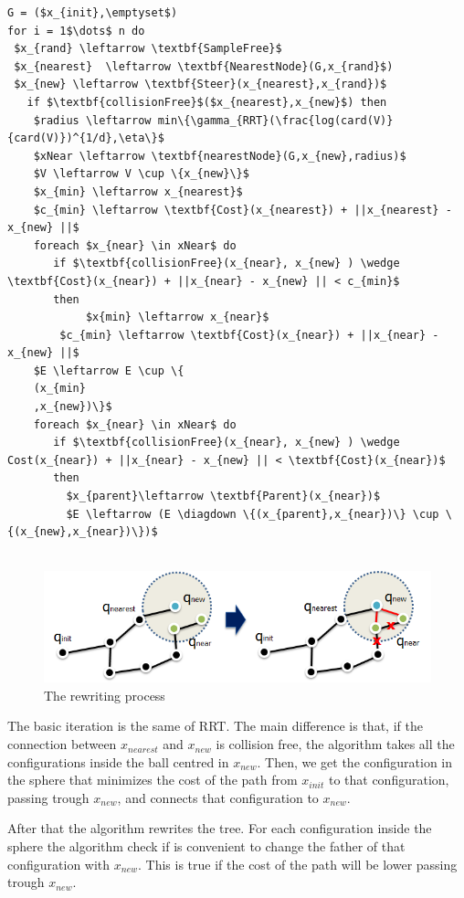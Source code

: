 \documentclass[10pt]{article}
\begin{document}
		\begin{lstlisting}[frame=single, mathescape=true,caption={RRT*}]
G = ($x_{init},\emptyset$)
for i = 1$\dots$ n do
 $x_{rand} \leftarrow \textbf{SampleFree}$
 $x_{nearest}  \leftarrow \textbf{NearestNode}(G,x_{rand}$)
 $x_{new} \leftarrow \textbf{Steer}(x_{nearest},x_{rand})$	
   if $\textbf{collisionFree}$($x_{nearest},x_{new}$) then
	$radius \leftarrow min\{\gamma_{RRT}(\frac{log(card(V)}{card(V)})^{1/d},\eta\}$
	$xNear \leftarrow \textbf{nearestNode}(G,x_{new},radius)$
	$V \leftarrow V \cup \{x_{new}\}$
	$x_{min} \leftarrow x_{nearest}$
	$c_{min} \leftarrow \textbf{Cost}(x_{nearest}) + ||x_{nearest} - x_{new} ||$
	foreach $x_{near} \in xNear$ do
	   if $\textbf{collisionFree}(x_{near}, x_{new} ) \wedge \textbf{Cost}(x_{near}) + ||x_{near} - x_{new} || < c_{min}$
	   then
	        $x{min} \leftarrow x_{near}$
		$c_{min} \leftarrow \textbf{Cost}(x_{near}) + ||x_{near} - x_{new} ||$
	$E \leftarrow E \cup \{
	(x_{min}
	,x_{new})\}$
	foreach $x_{near} \in xNear$ do
	   if $\textbf{collisionFree}(x_{near}, x_{new} ) \wedge Cost(x_{near}) + ||x_{near} - x_{new} || < \textbf{Cost}(x_{near})$
	   then
	     $x_{parent}\leftarrow \textbf{Parent}(x_{near})$
	     $E \leftarrow (E \diagdown \{(x_{parent},x_{near})\} \cup \{(x_{new},x_{near})\})$
	
	\end{lstlisting}
	\FloatBarrier
	\begin{figure}[hbt]
		\centering
		\includegraphics[width=\linewidth]{rrtRew.png}
		\caption{The rewriting process}
		\label{fig:rewrite}
	\end{figure}
	\FloatBarrier
	The basic iteration is the same of RRT. The main difference is that, if the connection between $x_{nearest}$ and $x_{new}$ is collision free, the algorithm takes all the configurations inside the ball centred in $x_{new}$. Then, we get the configuration in the sphere that minimizes the cost of the path from $x_{init}$ to that configuration, passing trough $x_{new}$, and connects that configuration to $x_{new}$.
	
	After that the algorithm rewrites the tree. For each configuration inside the sphere the algorithm check if is convenient to change the father of that configuration with $x_{new}$. This is true if the cost of the path will be lower passing trough $x_{new}$.
	
\end{document}
